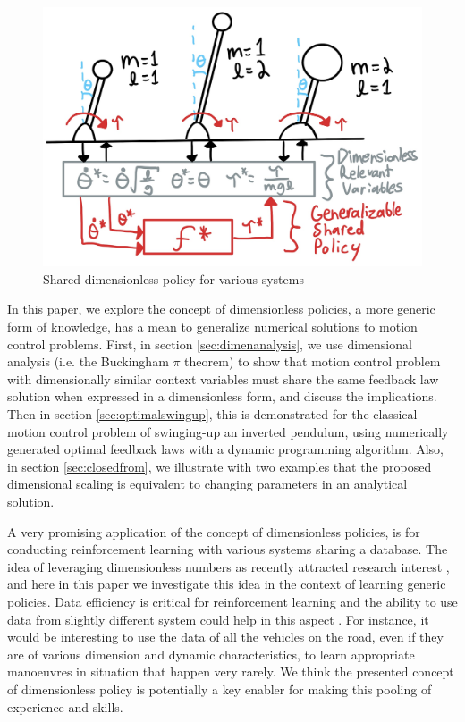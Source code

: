 \begin{figure}[t]
\begin{center}
\includegraphics[width=0.99\linewidth]{fig/big_picture3.jpg}
\caption{Shared dimensionless policy for various systems}\label{fig:big_picture}
\end{center}
\vspace{-10pt}
\end{figure}

In this paper, we explore the concept of dimensionless policies, a more generic form of knowledge, has a mean to generalize numerical solutions to motion control problems. First, in section \ref{sec:dimenanalysis}, we use dimensional analysis (i.e. the Buckingham $\pi$ theorem) to show that motion control problem with dimensionally similar context variables must share the same feedback law solution when expressed in a dimensionless form, and discuss the implications. Then in section \ref{sec:optimalswingup}, this is demonstrated for the classical motion control problem of swinging-up an inverted pendulum, using numerically generated optimal feedback laws with a dynamic programming algorithm. Also, in section \ref{sec:closedfrom}, we illustrate with two examples that the proposed dimensional scaling is equivalent to changing parameters in an analytical solution. 

A very promising application of the concept of dimensionless policies, is for conducting reinforcement learning with various systems sharing a database. The idea of leveraging dimensionless numbers as recently attracted research interest \cite{bakarji_dimensionally_2022}, and here in this paper we investigate this idea in the context of learning generic policies. Data efficiency is critical for reinforcement learning and the ability to use data from slightly different system could help in this aspect \cite{helwa_multi-robot_2017}\cite{pereida_data-efficient_2018}\cite{sorocky_experience_2020}. For instance, it would be interesting to use the data of all the vehicles on the road, even if they are of various dimension and dynamic characteristics, to learn appropriate manoeuvres in situation that happen very rarely. We think the presented concept of dimensionless policy is potentially a key enabler for making this pooling of experience and skills.

